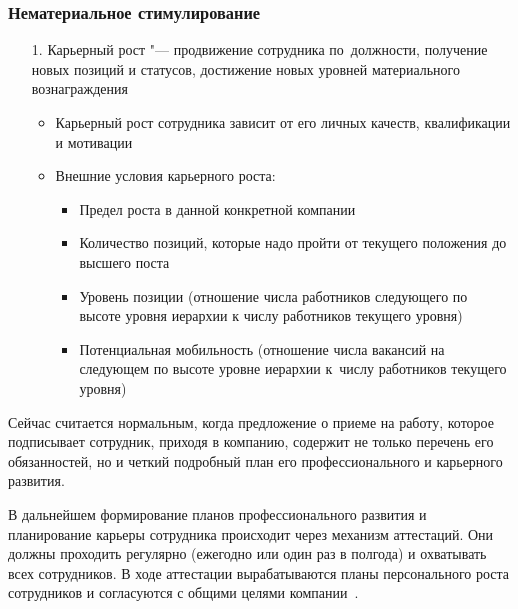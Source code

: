 \documentclass{../industrial-development}
\begin{document}
	\begin{frame} \frametitle{Нематериальное стимулирование}
		\begin{itemize}
			\item[1.] \alert{Карьерный рост} "--- продвижение сотрудника по~должности, получение новых позиций и статусов, достижение новых уровней материального вознаграждения
			\begin{itemize}
				
				\item Карьерный рост сотрудника зависит от его личных качеств, квалификации и мотивации
				\item Внешние условия карьерного роста:
				\begin{itemize}
					\item Предел роста в данной конкретной компании
					\item Количество позиций, которые надо пройти от текущего положения до высшего поста
					\item Уровень позиции (отношение числа работников следующего по высоте уровня иерархии к числу работников текущего уровня)
					\item Потенциальная мобильность (отношение числа вакансий на следующем по высоте уровне иерархии к~числу работников текущего уровня)
				\end{itemize}
			\end{itemize}
		\end{itemize}
	\end{frame}
	
	\lecturenotes
	
	Сейчас считается нормальным, когда предложение о приеме на работу, которое подписывает сотрудник, приходя в компанию, содержит не только перечень его обязанностей, но и четкий подробный план его профессионального и карьерного развития.
	
	В дальнейшем формирование планов профессионального развития и планирование карьеры сотрудника происходит через механизм аттестаций. Они должны проходить регулярно (ежегодно или один раз в полгода) и охватывать всех сотрудников. В ходе аттестации вырабатываются планы персонального роста сотрудников и согласуются с общими целями компании~\cite{TriKitMotiv}.
	
\end{document}
